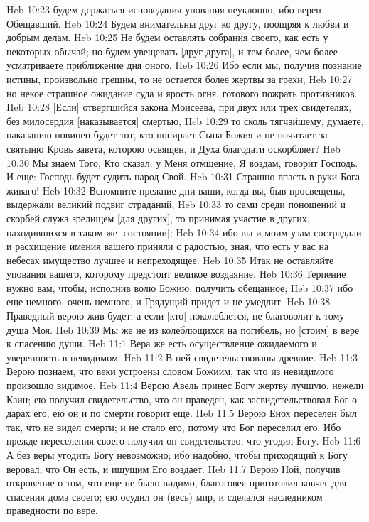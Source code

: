 Heb 10:23  будем держаться исповедания упования неуклонно, ибо верен Обещавший.
Heb 10:24  Будем внимательны друг ко другу, поощряя к любви и добрым делам.
Heb 10:25  Не будем оставлять собрания своего, как есть у некоторых обычай; но будем увещевать [друг друга], и тем более, чем более усматриваете приближение дня оного.
Heb 10:26  Ибо если мы, получив познание истины, произвольно грешим, то не остается более жертвы за грехи,
Heb 10:27  но некое страшное ожидание суда и ярость огня, готового пожрать противников.
Heb 10:28  [Если] отвергшийся закона Моисеева, при двух или трех свидетелях, без милосердия [наказывается] смертью,
Heb 10:29  то сколь тягчайшему, думаете, наказанию повинен будет тот, кто попирает Сына Божия и не почитает за святыню Кровь завета, которою освящен, и Духа благодати оскорбляет?
Heb 10:30  Мы знаем Того, Кто сказал: у Меня отмщение, Я воздам, говорит Господь. И еще: Господь будет судить народ Свой.
Heb 10:31  Страшно впасть в руки Бога живаго!
Heb 10:32  Вспомните прежние дни ваши, когда вы, быв просвещены, выдержали великий подвиг страданий,
Heb 10:33  то сами среди поношений и скорбей служа зрелищем [для других], то принимая участие в других, находившихся в таком же [состоянии];
Heb 10:34  ибо вы и моим узам сострадали и расхищение имения вашего приняли с радостью, зная, что есть у вас на небесах имущество лучшее и непреходящее.
Heb 10:35  Итак не оставляйте упования вашего, которому предстоит великое воздаяние.
Heb 10:36  Терпение нужно вам, чтобы, исполнив волю Божию, получить обещанное;
Heb 10:37  ибо еще немного, очень немного, и Грядущий придет и не умедлит.
Heb 10:38  Праведный верою жив будет; а если [кто] поколеблется, не благоволит к тому душа Моя.
Heb 10:39  Мы же не из колеблющихся на погибель, но [стоим] в вере к спасению души.
Heb 11:1  Вера же есть осуществление ожидаемого и уверенность в невидимом.
Heb 11:2  В ней свидетельствованы древние.
Heb 11:3  Верою познаем, что веки устроены словом Божиим, так что из невидимого произошло видимое.
Heb 11:4  Верою Авель принес Богу жертву лучшую, нежели Каин; ею получил свидетельство, что он праведен, как засвидетельствовал Бог о дарах его; ею он и по смерти говорит еще.
Heb 11:5  Верою Енох переселен был так, что не видел смерти; и не стало его, потому что Бог переселил его. Ибо прежде переселения своего получил он свидетельство, что угодил Богу.
Heb 11:6  А без веры угодить Богу невозможно; ибо надобно, чтобы приходящий к Богу веровал, что Он есть, и ищущим Его воздает.
Heb 11:7  Верою Ной, получив откровение о том, что еще не было видимо, благоговея приготовил ковчег для спасения дома своего; ею осудил он (весь) мир, и сделался наследником праведности по вере.
